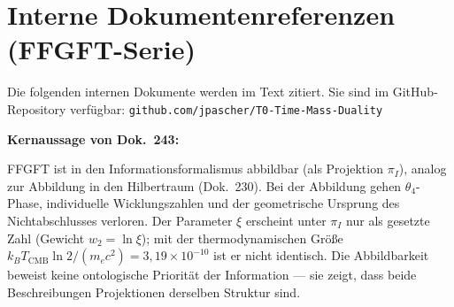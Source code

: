 \section*{Interne Dokumentenreferenzen (FFGFT-Serie)}

Die folgenden internen Dokumente werden im Text zitiert. Sie sind im
GitHub-Repository verfügbar:
\texttt{github.com/jpascher/T0-Time-Mass-Duality}

\begin{center}
\renewcommand{\arraystretch}{1.3}
{\small
{}
}
\end{center}

\begin{keyresult}
  \textbf{Kernaussage von Dok.~243:}

  FFGFT ist in den Informationsformalismus abbildbar (als Projektion
  $\pi_I$), analog zur Abbildung in den Hilbertraum (Dok.~230).
  Bei der Abbildung gehen $\theta_4$-Phase, individuelle
  Wicklungszahlen und der geometrische Ursprung des Nichtabschlusses
  verloren. Der Parameter $\xi$ erscheint unter $\pi_I$ nur als gesetzte
  Zahl (Gewicht $w_2 = \ln\xi$); mit der thermodynamischen Größe
  $k_BT_\text{CMB}\ln2/(m_ec^2) = 3{,}19\times10^{-10}$ ist er nicht identisch.
  Die Abbildbarkeit beweist keine ontologische
  Priorität der Information --- sie zeigt, dass beide Beschreibungen
  Projektionen derselben Struktur sind.
\end{keyresult}
